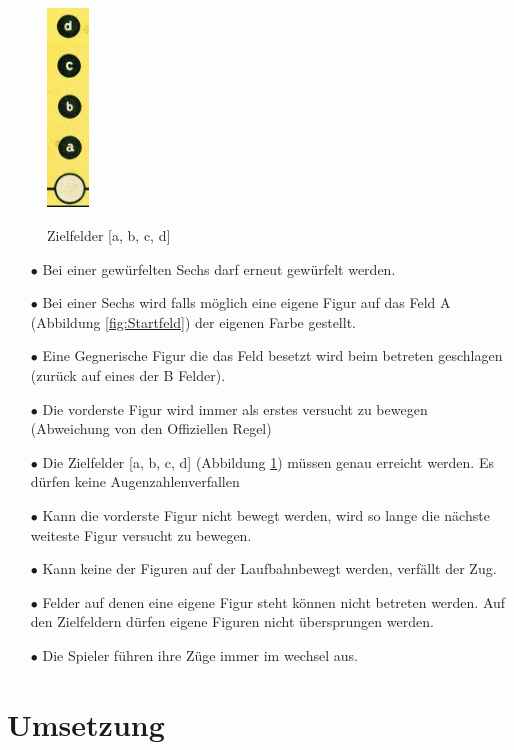 \documentclass[a4paper,11pt,ngerman]{scrartcl}
\begin{document}
\begin{figure} 
	\centering
	\includegraphics[width=0.1\textwidth]{goal}		
	\caption{}
	\small{Zielfelder [a, b, c, d]}
	\label{fig:Zielfelder}
\end{figure}
\begin{enumerate}
	
	\item [$\bullet$] Bei einer gewürfelten Sechs darf erneut gewürfelt werden.
	\item [$\bullet$]Bei einer Sechs wird falls möglich eine eigene Figur auf das Feld A (Abbildung \ref{fig:Startfeld}) der eigenen Farbe gestellt.
	\item [$\bullet$] Eine Gegnerische Figur die das Feld besetzt wird beim betreten geschlagen (zurück auf eines der B Felder).
	\item [$\bullet$] Die vorderste Figur wird immer als erstes versucht zu bewegen (Abweichung von den Offiziellen Regel)
	\item [$\bullet$] Die Zielfelder [a, b, c, d] (Abbildung \ref{fig:Zielfelder}) müssen genau erreicht werden. Es dürfen keine \glqq Augenzahlen\grqq\space verfallen
	\item [$\bullet$] Kann die vorderste Figur nicht bewegt werden, wird so lange die nächste weiteste Figur versucht zu bewegen.
	\item [$\bullet$] Kann keine der Figuren auf der \glqq Laufbahn\grqq \space bewegt werden, verfällt der Zug.
	\item [$\bullet$] Felder auf denen eine eigene Figur steht können nicht betreten werden. Auf den Zielfeldern dürfen eigene Figuren nicht übersprungen werden.
	\item [$\bullet$] Die Spieler führen ihre Züge immer im wechsel aus.
\end{enumerate}


\section{Umsetzung}
 
\end{document}
